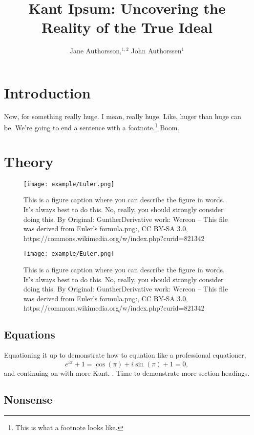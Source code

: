 \documentclass{ewass_ss4proc}
\title{Kant Ipsum: Uncovering the Reality of the True Ideal}
\author{Jane Authorsson,$^{1,2}$ 
        John Authorssen$^{1}$}
\affiliation{$^{1}$ Department of Physics \& Astronomy, University, City, Country \\
			 $^{2}$ Distinguished Postdoctoral Fellow in Astroquackery}
\begin{document}
\maketitle

\section{Introduction}
\kant Now, for something really huge. I mean, really huge. Like, huger than huge can be. We're going to end a sentence with a footnote.\footnote{ This is what a footnote 
looks like.} Boom.

\section{Theory}
\kant

\begin{figure}
	\centering
	\texttt{[image: example/Euler.png]}
	\caption{This is a figure caption where you can describe the figure in words. It's always best to do this. No, really, you should strongly consider doing this. By Original: GuntherDerivative work: Wereon -- This file was derived from Euler's formula.png:, CC BY-SA 3.0, https://commons.wikimedia.org/w/index.php?curid=821342}
	\label{fig:fig_narrow}
\end{figure}

\begin{figure*}[ht]
	\centering
	\texttt{[image: example/Euler.png]}
	\caption{This is a figure caption where you can describe the figure in words. It's always best to do this. No, really, you should strongly consider doing this. By Original: GuntherDerivative work: Wereon -- This file was derived from Euler's formula.png:, CC BY-SA 3.0, https://commons.wikimedia.org/w/index.php?curid=821342}
	\label{fig:fig_wide}
\end{figure*}

\subsection{Equations}
Equationing it up to demonstrate how to equation like a professional equationer,
\begin{equation}
	e^{i\pi} + 1 = \cos(\pi) + i\sin(\pi) + 1 = 0,
\end{equation}
and continuing on with more Kant. \kant. Time to demonstrate more section headings.

\subsection{Nonsense}
\end{document}
